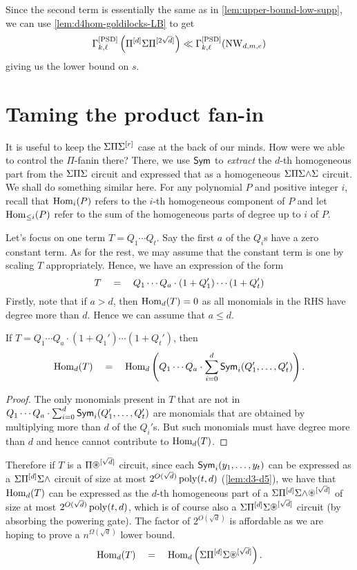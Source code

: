 Since the second term is essentially the same as in \autoref{lem:upper-bound-low-supp}, we can use \autoref{lem:d4hom-goldilocks-LB} to get
\[
\Gamma^{\mathrm{[PSD]}}_{k,\ell}\left(\Pi^{[d]}\Sigma\Pi^{[2\sqrt{d}]}\right) \ll \Gamma^{\mathrm{[PSD]}}_{k,\ell}(\operatorname{\mathrm{NW}}_{d,m,e})
\]
giving us the lower bound on $s$. 

\section{Taming the product fan-in}

It is useful to keep the $\Sigma\Pi\Sigma^{[r]}$ case at the back of our minds.
How were we able to control the $\Pi$-fanin there?
There, we use $\operatorname{\mathsf{Sym}}$ to \emph{extract} the $d$-th homogeneous part from the $\Sigma\Pi\Sigma$ circuit and expressed that as a homogeneous $\Sigma\Pi\Sigma\mathord{\wedge}\Sigma$ circuit. 
We shall do something similar here.
For any polynomial $P$ and positive integer $i$, recall that $\operatorname{Hom}_i(P)$ refers to the $i$-th homogeneous component of $P$ and let $\operatorname{Hom}_{\leq i}(P)$ refer to the sum of the  homogeneous parts of degree up to $i$ of $P$. 

Let's focus on one term $T = Q_1 \cdots Q_t$. Say the first $a$ of the $Q_i$s have a zero constant term. As for the rest, we may assume that the constant term is one by scaling $T$ appropriately. Hence, we have an expression of the form 
\[
T \quad = \quad Q_1 \cdots Q_a \cdot (1 + Q_{1}') \cdots (1 + Q_t')
\]
Firstly, note that if $a > d$, then $\operatorname{Hom}_d(T) = 0$ as all monomials in the RHS have degree more than $d$. Hence we can assume that $a\leq d$. 

\begin{claim}
If $T = Q_1 \cdots Q_a \cdot (1 + Q_{1}') \cdots (1 + Q_t')$, then 
\[
\operatorname{Hom}_d(T) \quad = \quad \operatorname{Hom}_d\left(Q_1 \cdots Q_a \cdot \sum_{i=0}^d \operatorname{\mathsf{Sym}}_i(Q_{1}', \ldots,  Q_t')\right).
\]
\end{claim}
\begin{proof}
The only monomials present in $T$ that are not in $Q_1 \cdots Q_a \cdot \sum_{i=0}^d \operatorname{\mathsf{Sym}}_i(Q_{1}', \ldots,  Q_t')$ are monomials that are obtained by multiplying more than $d$ of the $Q_i'$s. But such monomials must have degree more than $d$ and hence cannot contribute to $\operatorname{Hom}_d(T)$. 
\end{proof}

Therefore if $T$ is a $\Pi\circast^{[\sqrt{d}]}$ circuit, since each $\operatorname{\mathsf{Sym}}_i(y_1,\ldots, y_t)$ can be expressed as a $\Sigma\Pi^{[d]}\Sigma\mathord{\wedge}$ circuit of size at most $2^{O(\sqrt{d})} \operatorname{poly}(t,d)$ (\autoref{lem:d3-d5}), we have that $\operatorname{Hom}_d(T)$ can be expressed as the $d$-th homogeneous part of a  $\Sigma\Pi^{[d]}\Sigma\mywedge\circast^{[\sqrt{d}]}$ of size at most $2^{O(\sqrt{d})} \operatorname{poly}(t,d)$, which is of course also a $\Sigma\Pi^{[d]}\Sigma\circast^{[\sqrt{d}]}$ circuit (by absorbing the powering gate). The factor of $2^{O(\sqrt{d})}$ is affordable as we are hoping to prove a $n^{\Omega(\sqrt{d})}$ lower bound. 
\[
\Hom_d(T) \spaced{=} \Hom_d\inparen{\Sigma\Pi^{[d]}\Sigma\circast^{[\sqrt{d}]}}.
\]

